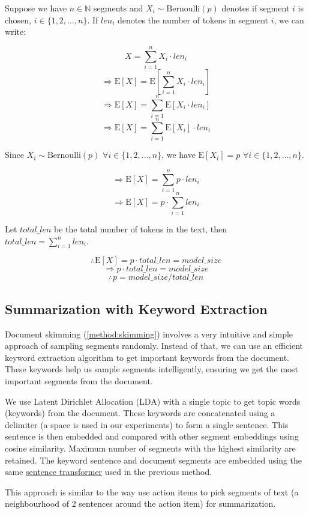 		Suppose we have $n \in \mathbb{N}$ segments and $X_i \sim \mathrm{Bernoulli}(p)$ denotes
		if segment $i$ is chosen, $i \in \{1, 2, \dots, n\}$.
		If $len_i$ denotes the number of tokens in segment $i$, we can write:

		\[ X = \sum_{i = 1}^{n} X_i \cdot len_i \]
		\[ \Rightarrow \mathrm{E}[X] = \mathrm{E}[\sum_{i = 1}^{n} X_i \cdot len_i] \]
		\[ \Rightarrow \mathrm{E}[X] = \sum_{i = 1}^{n} \mathrm{E}[X_i \cdot len_i] \]
		\[ \Rightarrow \mathrm{E}[X] = \sum_{i = 1}^{n} \mathrm{E}[X_i] \cdot len_i \]

		Since $X_i \sim \mathrm{Bernoulli}(p)$ $\forall i \in \{1, 2, \dots, n\}$, we
		have $\mathrm{E}[X_i] = p$ $\forall i \in \{1, 2, \dots, n\}$.

		\[ \Rightarrow \mathrm{E}[X] = \sum_{i = 1}^{n} p \cdot len_i \]
		\[ \Rightarrow \mathrm{E}[X] = p \cdot \sum_{i = 1}^{n} len_i \]

		Let $total\_len$ be the total number of tokens in the text, then
		$total\_len = \sum_{i = 1}^{n} len_i$.

		\[ \therefore \mathrm{E}[X] = p \cdot total\_len = model\_size \]
		\[ \Rightarrow p \cdot total\_len = model\_size \]
		\[ \therefore p = model\_size / total\_len \]


	\subsection{Summarization with Keyword Extraction}
		\label{method:keyword}

		Document skimming (\ref{method:skimming}) involves a very intuitive and simple approach of
		sampling segments randomly.
		Instead of that, we can use an efficient keyword extraction algorithm to get important keywords
		from the document.
		These keywords help us sample segments intelligently, ensuring we get the most important
		segments from the document.

		We use Latent Dirichlet Allocation (LDA) \cite{blei2003latent} with a single topic to get topic
		words (keywords) from the document.
		These keywords are concatenated using a delimiter (a space is used in our experiments) to form a
		single sentence.
		This sentence is then embedded and compared with other segment embeddings using cosine similarity.
		Maximum number of segments with the highest similarity are retained.
		The keyword sentence and document segments are embedded using the same
		\href{https://huggingface.co/sentence-transformers/all-MiniLM-L6-v2}{sentence transformer}
		used in the previous method.

		This approach is similar to the way \citet{golia2024action} use action items to pick segments
		of text (a neighbourhood of 2 sentences around the action item) for summarization.
